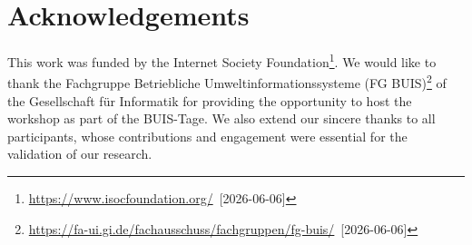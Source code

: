 \documentclass[english]{lni}
\begin{document}
\section*{Acknowledgements}
This work was funded by the Internet Society Foundation\footnote{\url{https://www.isocfoundation.org/}~[2026-06-06]}. We would like to thank the Fachgruppe Betriebliche Umweltinformationssysteme (FG BUIS)\footnote{\url{https://fa-ui.gi.de/fachausschuss/fachgruppen/fg-buis/}~[2026-06-06]} of the Gesellschaft für Informatik for providing the opportunity to host the workshop as part of the BUIS-Tage. We also extend our sincere thanks to all participants, whose contributions and engagement were essential for the validation of our research.



\printbibliography
\end{document}
